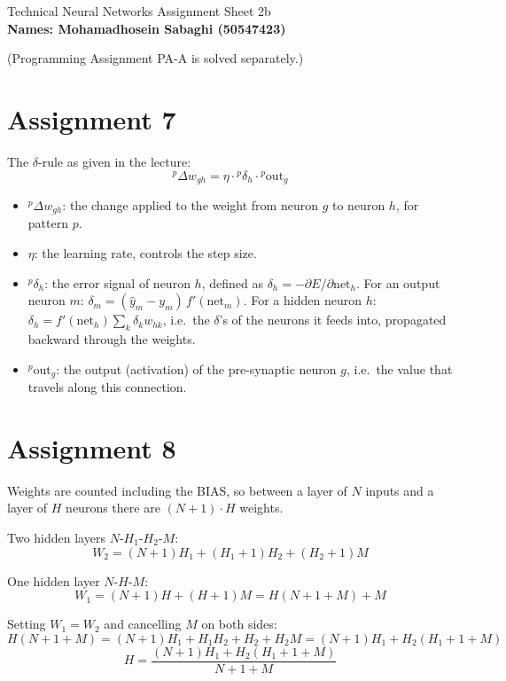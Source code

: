 \documentclass[11pt,a4paper]{article}
\begin{document}
\begin{center}
{\large Technical Neural Networks Assignment Sheet 2b}\\[4pt]
{\bfseries Names: Mohamadhosein Sabaghi (50547423)}
\end{center}

{\small (Programming Assignment PA-A is solved separately.)}

\section*{Assignment 7}

The $\delta$-rule as given in the lecture:
\[
  {}^p\!\Delta w_{gh} = \eta \cdot {}^p\delta_h \cdot {}^p\text{out}_g
\]

\begin{itemize}
  \item ${}^p\Delta w_{gh}$: the change applied to the weight from neuron $g$ to neuron $h$, for pattern $p$.
  \item $\eta$: the learning rate, controls the step size.
  \item ${}^p\delta_h$: the error signal of neuron $h$, defined as $\delta_h = -\partial E/\partial \mathrm{net}_h$. For an output
  neuron $m$: $\delta_m=(\hat y_m-y_m)\,f'(\mathrm{net}_m)$. For a hidden neuron $h$:
  $\delta_h = f'(\mathrm{net}_h)\sum_k \delta_k w_{hk}$, i.e.\ the $\delta$'s of the neurons it feeds into, propagated
  backward through the weights.
  \item ${}^p\text{out}_g$: the output (activation) of the pre-synaptic neuron $g$, i.e.\ the value that travels along
  this connection.
\end{itemize}

\section*{Assignment 8}

Weights are counted including the BIAS, so between a layer of $N$ inputs and a layer of $H$ neurons there are
$(N+1)\cdot H$ weights.

Two hidden layers $N$-$H_1$-$H_2$-$M$:
\[
  W_2 = (N+1)H_1 + (H_1+1)H_2 + (H_2+1)M
\]

One hidden layer $N$-$H$-$M$:
\[
  W_1 = (N+1)H + (H+1)M = H(N+1+M) + M
\]

Setting $W_1=W_2$ and cancelling $M$ on both sides:
\[
  H(N+1+M) = (N+1)H_1 + H_1H_2 + H_2 + H_2M = (N+1)H_1 + H_2(H_1+1+M)
\]
\[
  \boxed{H = \dfrac{(N+1)H_1 + H_2(H_1+1+M)}{N+1+M}}
\]
\end{document}
